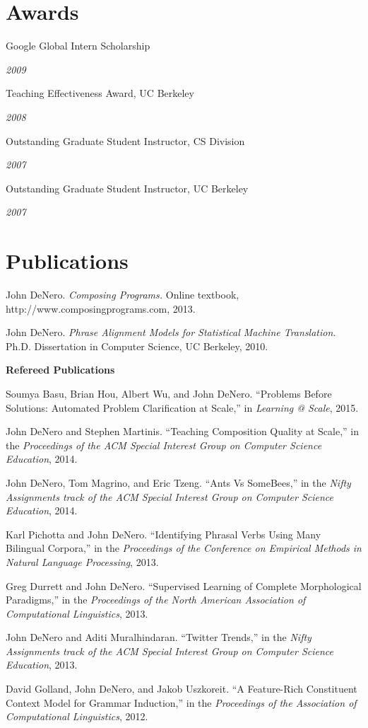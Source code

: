 \documentclass[margin,line]{res}
\newcommand{\dated}[2]{\parbox[t]{4.4in}{#1} \hspace{0.4in}
											 \parbox[t]{1in}{ {\it #2 } } }
\begin{document}
\begin{resume}
\section{\sc Awards}

	\dated{Google Global Intern Scholarship} { 2009 }

	\dated{Teaching Effectiveness Award, UC Berkeley} { 2008 }

	\dated{Outstanding Graduate Student Instructor, CS Division} { 2007 }

	\dated{Outstanding Graduate Student Instructor, UC Berkeley} { 2007 }

\section{\sc Publications}

John DeNero. {\it Composing Programs.} Online textbook,
http://www.composingprograms.com, 2013.

John DeNero. {\it Phrase Alignment Models for Statistical Machine Translation.}
Ph.D. Dissertation in Computer Science, UC Berkeley, 2010.

{\bf Refereed Publications }

Soumya Basu, Brian Hou, Albert Wu, and John DeNero. ``Problems Before Solutions: Automated Problem Clarification at Scale,'' in {\it Learning @ Scale}, 2015.

John DeNero and Stephen Martinis.  ``Teaching Composition Quality at Scale,'' in the {\it Proceedings of the ACM Special Interest Group on Computer Science Education}, 2014.

John DeNero, Tom Magrino, and Eric Tzeng.  ``Ants Vs SomeBees,'' in the {\it Nifty Assignments track of the ACM Special Interest Group on Computer Science Education}, 2014.

Karl Pichotta and John DeNero.  ``Identifying Phrasal Verbs Using Many Bilingual Corpora,'' in the {\it Proceedings of the Conference on Empirical Methods in Natural Language Processing}, 2013.

Greg Durrett and John DeNero.  ``Supervised Learning of Complete Morphological Paradigms,'' in the {\it Proceedings of the North American Association of Computational Linguistics}, 2013.

John DeNero and Aditi Muralhindaran.  ``Twitter Trends,'' in the {\it Nifty Assignments track of the ACM Special Interest Group on Computer Science Education}, 2013.

David Golland, John DeNero, and Jakob Uszkoreit. ``A Feature-Rich Constituent Context Model for Grammar Induction,'' in the {\it Proceedings of the Association of Computational Linguistics}, 2012.


\end{resume}
\end{document}
